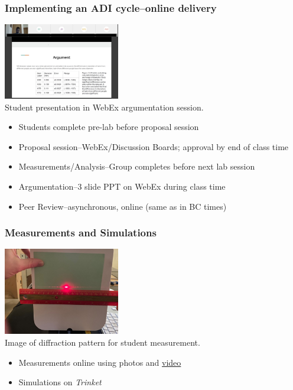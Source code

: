 \documentclass[aspectratio=169,shadow=true]{beamer}
\begin{document}
\begin{frame}
\frametitle{Implementing an ADI cycle--online delivery}
\begin{center}
\includegraphics[width=2in]{WebExArgumentation.png}\\
{\footnotesize Student presentation in WebEx argumentation session.}
\end{center}
\begin{itemize}
\item<+-> Students complete pre-lab before proposal session
\item<+-> Proposal session--WebEx/Discussion Boards; approval by end of class time
\item<+-> Measurements/Analysis--Group completes before next lab session
\item<+-> Argumentation--3 slide PPT on WebEx during class time
\item<+-> Peer Review--asynchronous, online (same as in BC times)
\end{itemize}
\end{frame}

\begin{frame}
\frametitle{Measurements and Simulations}
\begin{center}
\includegraphics[width=2in]{Hair1_red_pattern.jpg}\\
{\footnotesize Image of diffraction pattern for student measurement.}
\end{center}
\begin{itemize}
\item Measurements online using photos and \href{run:Spring4_100g.mp4}{video}
\item Simulations on \emph{Trinket}
\end{itemize}
\end{frame}
\end{document}
